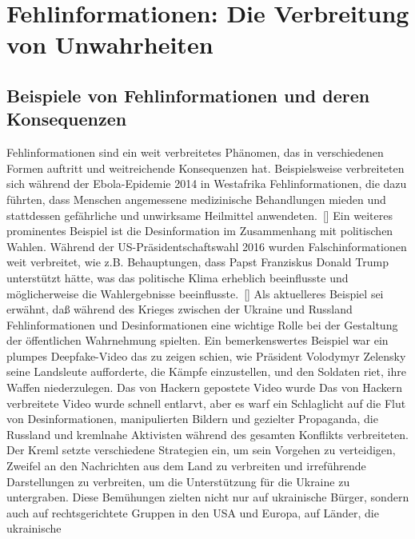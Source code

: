 \documentclass[a4paper,listof=totoc,bibliography=totoc]{scrartcl}
\begin{document}
\section{Fehlinformationen: Die Verbreitung von Unwahrheiten}

\subsection{Beispiele von Fehlinformationen und deren Konsequenzen}

Fehlinformationen sind ein weit verbreitetes Phänomen, das in verschiedenen Formen auftritt und weitreichende Konsequenzen hat. Beispielsweise verbreiteten sich 
während der Ebola-Epidemie 2014 in Westafrika Fehlinformationen, die dazu führten, dass Menschen angemessene medizinische Behandlungen mieden und stattdessen gefährliche 
und unwirksame Heilmittel anwendeten.~[\cite{vinck2019}] 
Ein weiteres prominentes Beispiel ist die Desinformation im Zusammenhang mit politischen Wahlen. Während der US-Präsidentschaftswahl 2016 wurden Falschinformationen weit 
verbreitet, wie z.B. Behauptungen, dass Papst Franziskus Donald Trump unterstützt hätte, was das politische Klima erheblich beeinflusste und möglicherweise die Wahlergebnisse 
beeinflusste.~[\cite{allcott2017}]
\newline
\newline
Als aktuelleres Beispiel sei erwähnt, daß während des Krieges zwischen der Ukraine und Russland Fehlinformationen und Desinformationen eine wichtige Rolle bei der Gestaltung der 
öffentlichen Wahrnehmung spielten. Ein bemerkenswertes Beispiel war ein plumpes Deepfake-Video das zu zeigen schien, wie Präsident Volodymyr Zelensky seine Landsleute aufforderte, die Kämpfe 
einzustellen, und den Soldaten riet, ihre Waffen niederzulegen. Das von Hackern gepostete Video wurde Das von Hackern verbreitete Video wurde schnell entlarvt, aber es warf ein Schlaglicht 
auf die Flut von Desinformationen, manipulierten Bildern und gezielter Propaganda, die Russland und kremlnahe Aktivisten während des gesamten Konflikts verbreiteten. 
\newline
\newline
Der Kreml setzte verschiedene Strategien ein, um sein Vorgehen zu verteidigen, Zweifel an den Nachrichten aus dem Land zu verbreiten und irreführende Darstellungen zu verbreiten, um die Unterstützung 
für die Ukraine zu untergraben. Diese Bemühungen zielten nicht nur auf ukrainische Bürger, sondern auch auf rechtsgerichtete Gruppen in den USA und Europa, auf Länder, die ukrainische 
\end{document}
